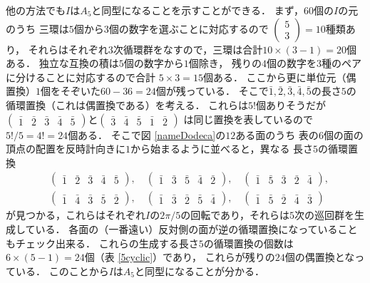 他の方法でも$I$は$A_5$と同型になることを示すことができる．
まず，$60$個の$I$の元のうち
三環は$5$個から$3$個の数字を選ぶことに対応するので
$\begin{pmatrix}
     5\\
     3
\end{pmatrix}
=10$種類あり，
それらはそれぞれ$3$次循環群をなすので，三環は合計$10\times (3-1)=20$個ある．
独立な互換の積は$5$個の数字から$1$個除き，
残りの$4$個の数字を$3$種のペアに分けることに対応するので合計
$5\times 3=15$個ある．
ここから更に単位元（偶置換）$1$個をそぞいた$60-36=24$個が残っている．
そこで$\bar 1, \bar 2 ,\bar 3 ,\bar 4, \bar 5$の長さ$5$の循環置換（これは偶置換である）を考える．
これらは$5!$個ありそうだが$\begin{pmatrix}\bar 1&\bar 2&\bar 3& \bar 4&\bar 5\end{pmatrix}$と$\begin{pmatrix}\bar 3& \bar 4&\bar 5&\bar 1&\bar 2\end{pmatrix}$
は同じ置換を表しているので$5!/5=4!=24$個ある．
そこで図 \ref{nameDodeca}の$12$ある面のうち
表の$6$個の面の頂点の配置を反時計向きに$1$から始まるように並べると，異なる
長さ$5$の循環置換
\[
\begin{split}
     &\begin{pmatrix}\bar 1&\bar 2&\bar 3&\bar 4&\bar 5\end{pmatrix},\quad
     \begin{pmatrix}\bar 1&\bar 3&\bar 5&\bar 4&\bar 2\end{pmatrix},\quad
     \begin{pmatrix}\bar 1&\bar 5&\bar 3&\bar 2&\bar 4\end{pmatrix},\\
     &\begin{pmatrix}\bar 1&\bar 4&\bar 3&\bar 5&\bar 2\end{pmatrix},\quad
     \begin{pmatrix}\bar 1&\bar 3&\bar 2&\bar 5&\bar 4\end{pmatrix},\quad
     \begin{pmatrix}\bar 1&\bar 5&\bar 2&\bar 4&\bar 3\end{pmatrix}
\end{split}
\]
が見つかる，これらはそれぞれ$I$の$2\pi/5$の回転であり，それらは$5$次の巡回群を生成している．
各面の（一番遠い）反対側の面が逆の循環置換になっていることもチェック出来る．
これらの生成する長さ$5$の循環置換の個数は$6\times(5-1)=24$個（表 \ref{5cyclic}）であり，
これらが残りの$24$個の偶置換となっている．
このことから$I$は$A_5$と同型になることが分かる．
